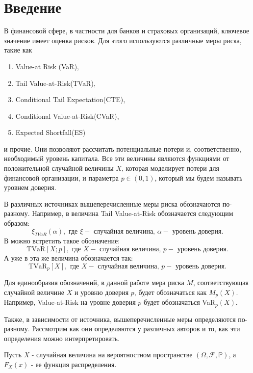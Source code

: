 \documentclass[12pt]{article}
\theoremstyle{plain}
\theoremstyle{definition}
\theoremstyle{remark}
\begin{document}
\clearpage
\thispagestyle{empty}
\null
\newpage

\setcounter{page}{1}

\section{Введение}

В финансовой сфере, в частности для банков и страховых организаций, ключевое значение имеет оценка рисков. Для этого используются различные меры риска, такие как
\begin{enumerate}
    \item Value-at Risk (VaR),
    \item Tail Value-at-Risk(TVaR),
    \item Conditional Tail Expectation(CTE),
    \item Conditional Value-at-Risk(CVaR),
    \item Expected Shortfall(ES)
\end{enumerate}
и прочие. Они позволяют рассчитать потенциальные потери и, соответственно, необходимый уровень капитала. Все эти величины являются функциями от положительной случайной величины $X$, которая моделирует потери для финансовой организации, и параметра $p \in (0, 1)$, который мы будем называть уровнем доверия. 

В различных источниках вышеперечисленные меры риска обозначаются по-разному. Например, в \cite{Peng} величина Tail Value-at-Risk обозначается следующим образом: 
\[
    \xi_{TVaR}(\alpha), \text{ где } \xi - \text{ случайная величина, } \alpha - \text{ уровень доверия.}
\]
В \cite{Denuit} можно встретить такое обозначение:
\[
    \text{TVaR}[X; p], \text{ где } X - \text{ случайная величина, } p - \text{ уровень доверия.}
\]
А уже в \cite{Desmedt} эта же величина обозначается так:
\[
    \text{TVaR}_p[X], \text{ где } X - \text{ случайная величина, } p - \text{ уровень доверия.}
\]

Для единообразия обозначений, в данной работе мера риска $M$, соответствующая случайной величине $X$ и уровню доверия $p$, будет обозначаться как $M_p(X)$. Например, Value-at-Risk на уровне доверия $p$ будет обозначаться VaR$_p(X)$.

Также, в зависимости от источника, вышеперечисленные меры определяются по-разному. Рассмотрим как они определяются у различных авторов и то, как эти определения можно интерпретировать. 

Пусть $X$ - случайная величина на вероятностном пространстве $(\Omega, \mathcal{F}, \mathbb{P})$, а $F_X(x)$ - ее функция распределения.
\end{document}
